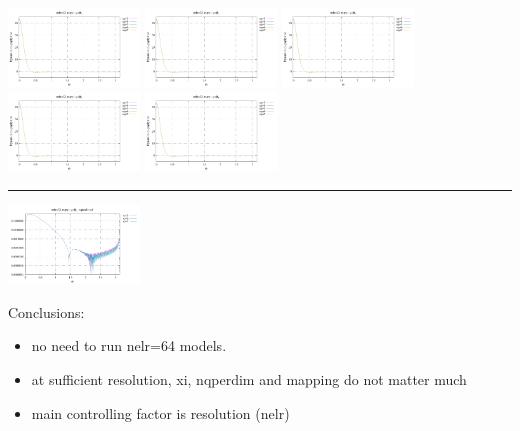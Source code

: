 \noindent
\includegraphics[width=3.5cm]{python_codes/fieldstone_152/RESULTS/exp2/d_t_64_m2}
\includegraphics[width=3.5cm]{python_codes/fieldstone_152/RESULTS/exp2/d_t_64_m3}
\includegraphics[width=3.5cm]{python_codes/fieldstone_152/RESULTS/exp2/d_t_64_m4}
\includegraphics[width=3.5cm]{python_codes/fieldstone_152/RESULTS/exp2/d_t_64_m5}
\includegraphics[width=3.5cm]{python_codes/fieldstone_152/RESULTS/exp2/d_t_64_m6}

\hrule

\includegraphics[width=3.5cm]{python_codes/fieldstone_152/RESULTS/exp2/vel_64_xi}


Conclusions:
\begin{itemize}
\item no need to run nelr=64 models.
\item at sufficient resolution, xi, nqperdim and mapping do not matter 
much 
\item main controlling factor is resolution (nelr)
\end{itemize}


